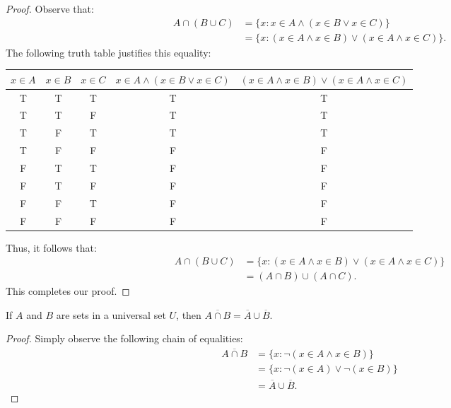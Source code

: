 \documentclass{exam}
\begin{document}
\begin{proof}
    Observe that:
    \begin{align*}
        A\cap(B\cup C) &= \{x:x\in A\land(x\in B\lor x\in C)\}\\
        &= \{x: (x\in A\land x\in B)\lor(x\in A\land x\in C)\}.
    \end{align*}
    The following truth table justifies this equality:
    \begin{center}
        \begin{tabular}{|c|c|c||c||c|}
            \hline
            $x\in A$ & $x\in B$ & $x\in C$ & $x\in A\land(x\in B\lor x\in C)$ & $(x\in A\land x\in B)\lor(x\in A\land x\in C)$\\
            \hline\hline
            T&T&T&T&T\\
            \hline
            T&T&F&T&T\\
            \hline
            T&F&T&T&T\\
            \hline
            T&F&F&F&F\\
            \hline
            F&T&T&F&F\\
            \hline
            F&T&F&F&F\\
            \hline
            F&F&T&F&F\\
            \hline
            F&F&F&F&F\\
            \hline
        \end{tabular}
    \end{center}
    Thus, it follows that:
    \begin{align*}
        A\cap(B\cup C) &= \{x: (x\in A\land x\in B)\lor(x\in A\land x\in C)\}\\
        &= (A\cap B)\cup(A\cap C).
    \end{align*}
    This completes our proof.
\end{proof}

\begin{proposition}{8.10}
    If $A$ and $B$ are sets in a universal set $U$, then $\overline{A\cap B}=\overline A\cup\overline B$.
\end{proposition}

\begin{proof}
    Simply observe the following chain of equalities:
    \begin{align*}
        \overline{A\cap B}&=\{x:\lnot(x\in A\land x\in B)\}\\
        &=\{x:\lnot(x\in A)\lor\lnot(x\in B)\}\\
        &=\overline A\cup\overline B.
    \end{align*}
\end{proof}
\end{document}
